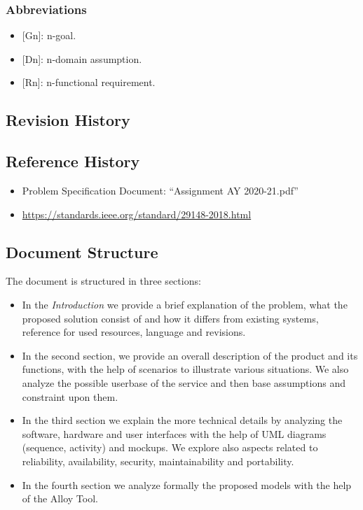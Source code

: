 \subsubsection{Abbreviations}
\begin{itemize}
    \item {[Gn]}: n-goal.
    \item {[Dn]}: n-domain assumption.
    \item {[Rn]}: n-functional requirement.
\end{itemize}

\subsection{Revision History}
\subsection{Reference History}
\begin{itemize}
    \item Problem Specification Document: ``Assignment AY 2020-21.pdf''
    \item \url{https://standards.ieee.org/standard/29148-2018.html}
\end{itemize}
\subsection{Document Structure}

The document is structured in three sections:

\begin{itemize}
    \item In the \emph{Introduction} we provide a brief explanation of the problem, what the proposed solution consist of and how it differs from existing systems, reference for used resources, language and revisions.
    \item In the second section, we provide an overall description of the product and its functions, with the help
    of scenarios to illustrate various situations. We also analyze the possible userbase of the service and then base
    assumptions and constraint upon them.
    \item In the third section we explain the more technical details by analyzing the software, hardware and user interfaces
    with the help of UML diagrams (sequence, activity) and mockups.
    We explore also aspects related to reliability, availability, security, maintainability and portability.
    \item In the fourth section we analyze formally the proposed models with the help of the Alloy Tool.
\end{itemize}
